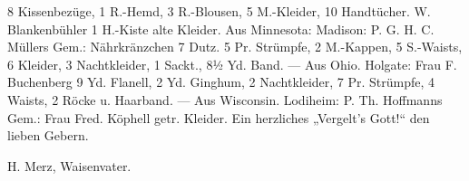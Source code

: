 8 Kissenbezüge, 1 R.-Hemd, 3 R.-Blousen, 5 M.-Kleider, 10 Handtücher. W. Blankenbühler 1 H.-Kiste alte Kleider. Aus Minnesota: Madison: P. G. H. C. Müllers Gem.: Nährkränzchen 7 Dutz. 5 Pr. Strümpfe, 2 M.-Kappen, 5 S.-Waists, 6 Kleider, 3 Nachtkleider, 1 Sackt., 8½ Yd. Band. — Aus Ohio. Holgate: Frau F. Buchenberg 9 Yd. Flanell, 2 Yd. Ginghum, 2 Nachtkleider, 7 Pr. Strümpfe, 4 Waists, 2 Röcke u. Haarband. — Aus Wisconsin. Lodiheim: P. Th. Hoffmanns Gem.: Frau Fred. Köphell getr. Kleider. Ein herzliches „Vergelt’s Gott!“ den lieben Gebern.

H. Merz, Waisenvater.
